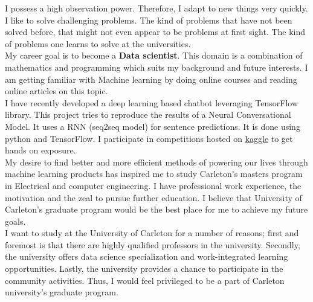 \documentclass[11pt]{article}
\begin{document}
I possess a high observation power. Therefore, I adapt to new things very quickly. I like to solve challenging problems. The kind of problems that have not been solved before, that might not even appear to be problems at first sight. The kind of problems one learns to solve at the universities.\\

My career goal is to become a \textbf{Data scientist}. This domain is a combination of mathematics and programming which suits my background and future interests. I am getting familiar with Machine learning by doing online courses and reading online articles on this topic.\\

I have recently developed a deep learning based chatbot leveraging TensorFlow library. This project tries to reproduce the results of a Neural Conversational Model. It uses a RNN (seq2seq model) for sentence predictions. It is done using python and TensorFlow. I participate in competitions hosted on \href{https://www.kaggle.com/}{kaggle} to get hands on exposure.\\

\newpage
My desire to find better and more efficient methods of powering our lives through machine learning products has inspired me to study Carleton’s masters program in Electrical and computer engineering. I have professional work experience, the motivation and the zeal to pursue further education. I believe that University of Carleton’s graduate program would be the best place for me to achieve my future goals.\\

I want to study at the University of Carleton for a number of reasons; first and foremost is that there are highly qualified professors in the university. Secondly, the university offers data science specialization and work-integrated learning opportunities. Lastly, the university provides a chance to participate in the community activities. Thus, I would feel privileged to be a part of Carleton university's graduate program.

  
\end{document}
